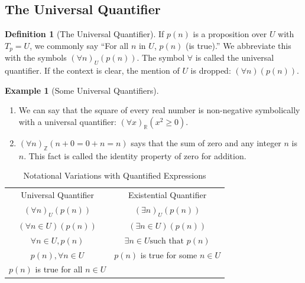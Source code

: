 \documentclass[10pt,]{book}
\theoremstyle{plain}
\theoremstyle{definition}
\newtheorem{definition}[theorem]{Definition}
\theoremstyle{definition}
\theoremstyle{definition}
\newtheorem{example}[theorem]{Example}
\theoremstyle{definition}
\begin{document}
\subsection[The Universal Quantifier]{The Universal Quantifier}\label{ss-universal-quantifier}
\begin{definition}[The Universal Quantifier]\label{def-universal-quantifier}
\label{notation-13}
If \(p(n)\) is a proposition over \(U\) with \(T_p=U\), we commonly say ``For all \(n\) in \(U\), \(p(n)\) (is true).'' We abbreviate this with the symbols \((\forall n)_U(p(n))\). The symbol \(\forall\) is called the universal quantifier.  If the context is clear, the mention of \(U\) is dropped: \((\forall n)(p(n))\).%
\end{definition}
\begin{example}[Some Universal Quantifiers]\label{ex-universal-misc}
\leavevmode%
\begin{enumerate}[label=\alph*]
\item\hypertarget{li-288}{}  We can say that the square of every real number is non-negative symbolically with a universal quantifier:  \((\forall x)
		_{\mathbb{R}}(x ^2 \geq  0)\).%
\item\hypertarget{li-289}{} \((\forall n) _{\mathbb{Z}} (n + 0 = 0 + n =n)\) says that the sum of zero and any integer \(n\) is \(n\). This fact is called the
		identity property of zero for addition.
\end{enumerate}
%
\end{example}
\leavevmode%
\begin{table}
\centering
\begin{tabular}{cc}
Universal Quantifier&Existential Quantifier\tabularnewline[0pt]
\((\forall n)_U(p(n))\) & \((\exists n)_U(p(n))\)\tabularnewline[0pt]
\((\forall n\in U)(p(n))\) & \((\exists n\in U)(p(n))\)\tabularnewline[0pt]
\(\forall n\in U, p(n)\)   &  \(\exists n\in U \textrm{such that } p(n)\)\tabularnewline[0pt]
\(p(n), \forall n \in  U\)   &     \(p(n)\) is true for some \(n \in  U\)\tabularnewline[0pt]
\(p(n)\) is true for all  \(n \in  U\)   &   
\end{tabular}
\caption{Notational Variations with Quantified Expressions\label{table-quantifier-variations}}
\end{table}
\typeout{************************************************}
\typeout{************************************************}
\end{document}
